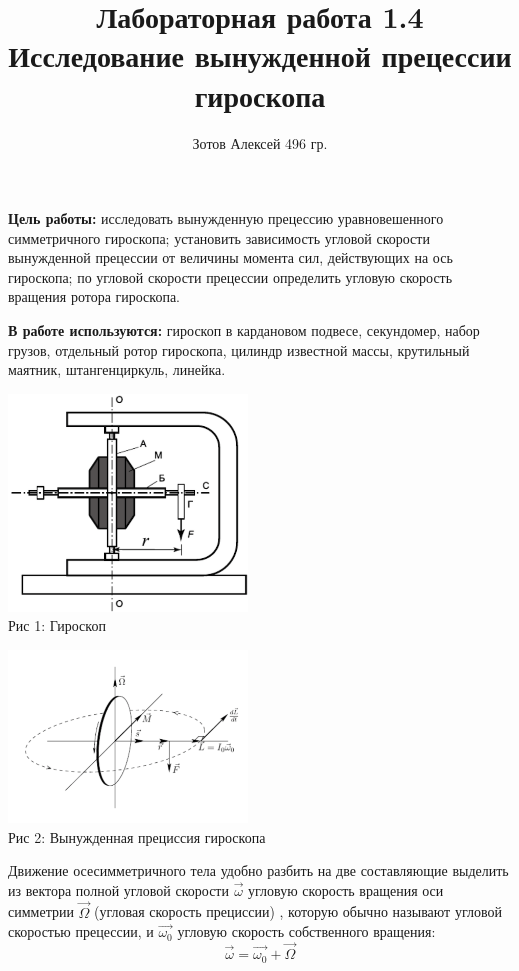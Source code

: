 \documentclass[8pt]{article}
\begin{document}
    \author {Зотов Алексей 496 гр.}
    \title {Лабораторная работа 1.4 \\ Исследование вынужденной прецессии гироскопа}
    \maketitle{}   

    \textbf{Цель работы:} исследовать вынужденную прецессию уравновешенного симметричного гироскопа; установить зависимость угловой скорости вынужденной прецессии от величины момента сил, действующих на ось гироскопа; по угловой скорости прецессии определить угловую скорость вращения ротора гироскопа.

    \textbf{В работе используются:} гироскоп в кардановом подвесе, секундомер, набор грузов, отдельный ротор гироскопа, цилиндр известной массы, крутильный маятник, штангенциркуль, линейка.

    \begin{center} 
        \includegraphics[width=2.5in]{gy1.png}  \\ Рис 1: Гироскоп 
    \end{center}

    \begin{center} 
        \includegraphics[width=2.5in]{gy2.png} \\ Рис 2: Вынужденная прециссия гироскопа
    \end{center}


    Движение осесимметричного тела удобно разбить на две составляющие   выделить из вектора полной угловой скорости $\vec{\omega}$ угловую скорость вращения оси симметрии $\vec{\Omega}$ (угловая скорость прециссии) , которую обычно называют угловой скоростью прецессии, и $\vec{\omega_0}$   угловую скорость  собственного  вращения:
    \begin{equation}
        \vec{\omega} = \vec{\omega_0} + \vec{\Omega} 
    \end{equation}
\end{document}
